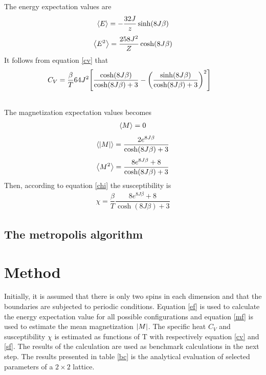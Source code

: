 \documentclass[%
reprint,nofootinbib,
amsmath,amssymb,
aps,
]{revtex4-1}
\begin{document}
The energy expectation values are \vspace{1mm}
\begin{align}
	\expval{E} = -\dfrac{32J}{z}\sinh(8J\beta)
\end{align}\vspace{1mm}
\begin{align}
	\expval{E^2} = \dfrac{258J^2}{Z}\cosh(8J\beta)
\end{align}\vspace{1mm}
It follows from equation \ref{cv} that \vspace{1mm}
\begin{align}
	C_V= \dfrac{\beta}{T}64J^2\qty[\dfrac{\cosh(8J\beta)}{\cosh(8J\beta) + 3}  -\qty(\dfrac{\sinh(8J\beta)}{\cosh(8J\beta) + 3 })^2]\nonumber  \\&\nonumber \\
\end{align}\vspace{1mm}
The magnetization expectation values becomes \vspace{1mm}
\begin{align*}
	\expval{M} =  0
\end{align*}\vspace{1mm}
\begin{align*}
\expval{\abs{M}} =  \dfrac{2e^{8J\beta}}{\cosh(8J\beta) + 3 }
\end{align*}\vspace{1mm}
\begin{align*}
\expval{M^2} = \dfrac{8e^{8J\beta} + 8}{\cosh(8J\beta) + 3}
\end{align*}\vspace{1mm}
Then, according to equation \ref{chi} the susceptibility is \vspace{1mm}
\begin{align}
	\chi = \dfrac{\beta}{T}\dfrac{8e^{8J\beta} + 8}{\cosh(8J\beta) + 3}
\end{align}
\subsection{The metropolis algorithm}

\section{Method} \noindent 
Initially, it is assumed that there is only two spins in each dimension and that the boundaries are subjected to periodic conditions. Equation \ref{ef} is used to calculate the energy expectation value for all possible configurations and equation \ref{mf} is used to estimate the mean magnetization $\abs{M}$. The specific heat $C_V$ and susceptibility $\chi$ is estimated as functions of T with respectively equation \ref{cv} and \ref{sf}. The results of the calculation are used as benchmark calculations in the next step. 
The results presented in table \ref{bc} is the analytical evaluation of selected parameters of a $2\times2$ lattice.
\end{document}
